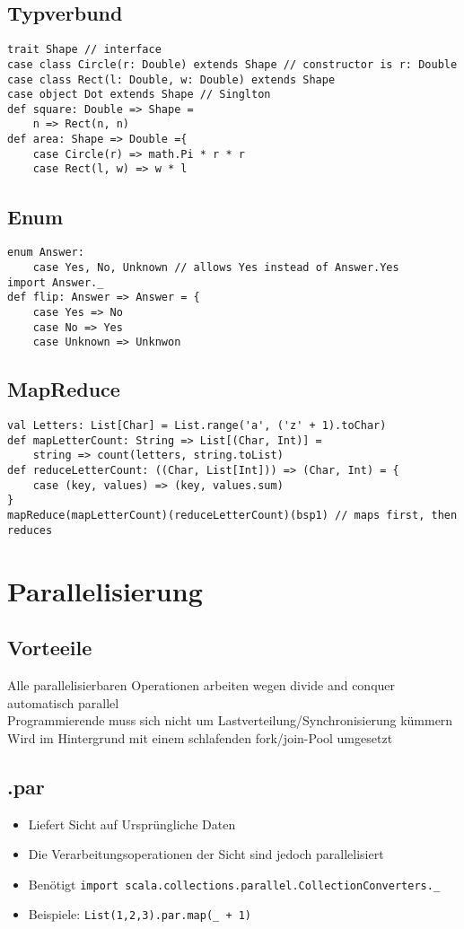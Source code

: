 \subsection{Typverbund}
\begin{verbatim}
trait Shape // interface
case class Circle(r: Double) extends Shape // constructor is r: Double
case class Rect(l: Double, w: Double) extends Shape
case object Dot extends Shape // Singlton
def square: Double => Shape =
    n => Rect(n, n)
def area: Shape => Double ={
    case Circle(r) => math.Pi * r * r
    case Rect(l, w) => w * l
\end{verbatim}
\subsection{Enum}
\begin{verbatim}
enum Answer:
	case Yes, No, Unknown // allows Yes instead of Answer.Yes
import Answer._ 
def flip: Answer => Answer = {
    case Yes => No
    case No => Yes
    case Unknown => Unknwon
\end{verbatim}
\subsection{MapReduce}
\begin{verbatim}
val Letters: List[Char] = List.range('a', ('z' + 1).toChar)
def mapLetterCount: String => List[(Char, Int)] = 
    string => count(letters, string.toList)
def reduceLetterCount: ((Char, List[Int])) => (Char, Int) = {
    case (key, values) => (key, values.sum)
}
mapReduce(mapLetterCount)(reduceLetterCount)(bsp1) // maps first, then reduces	
\end{verbatim}
\section{Parallelisierung}
\subsection{Vorteeile}
Alle parallelisierbaren Operationen arbeiten wegen \glqq{}divide and conquer\grqq{} automatisch parallel \\
Programmierende muss sich nicht um Lastverteilung/Synchronisierung kümmern \\
Wird im Hintergrund mit einem schlafenden fork/join-Pool umgesetzt
\subsection{.par}
\begin{itemize}
	\item Liefert Sicht auf Ursprüngliche Daten
	\item Die Verarbeitungsoperationen der Sicht sind jedoch parallelisiert
	\item Benötigt \verb|import scala.collections.parallel.CollectionConverters._|
	\item Beispiele: \verb|List(1,2,3).par.map(_ + 1)|
\end{itemize}
